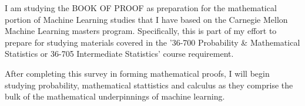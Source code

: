 \documentclass[../main.tex]{subfiles}
\begin{document}
I am studying the BOOK OF PROOF as preparation for the mathematical portion of
Machine Learning studies that I have based on the Carnegie Mellon Machine
Learning masters program. Specifically, this is part of my effort to prepare
for studying materials covered in the '36-700 Probability \& Mathematical
Statistics or 36-705 Intermediate Statistics' course requirement.

After completing this survey in forming mathematical proofs, I will begin
studying probability, mathematical stattistics and calculus as they comprise
the bulk of the mathematical underpinnings of machine learning.
\end{document}
